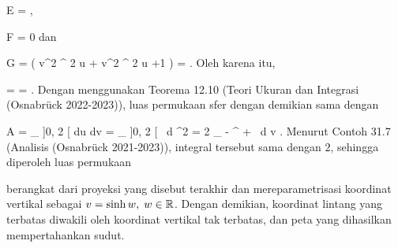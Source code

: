 {\mavergleichskettedisp
{\vergleichskette
{E
}
{ =} { {  }
}
{ } {
}
{ } {
}
{ } {
}
}
{}{}{,}

\mavergleichskettedisp
{\vergleichskette
{F
}
{ =} { 0
}
{ } {
}
{ } {
}
{ } {
}
}
{}{}{}
dan

\mavergleichskettedisp
{\vergleichskette
{G
}
{ =} { {  } \left(  v^2 \cos^{ 2  }  u + v^2 \sin^{ 2  }  u +1  \right)
}
{ =} { {  }
}
{ } {
}
{ } {
}
}
{}{}{.}
Oleh karena itu,

\mavergleichskettedisp
{\vergleichskette
{ 
}
{ =} { 
}
{ =} { {  }
}
{ } {
}
{ } {
}
}
{}{}{.}
Dengan menggunakan
Teorema 12.10 (Teori Ukuran dan Integrasi (Osnabrück 2022-2023)),
luas permukaan sfer dengan demikian sama dengan

\mavergleichskettealign
{\vergleichskettealign
{A
}
{ =} {
\int_{  ]0, 2 \pi[ \times \R   }   {  }  du \wedge dv
}
{ =} { \int_{ ]0, 2 \pi[ \times  \R   }   {  }    \,  d  \lambda^2
}
{ =} { 2 \pi \int_{  - \infty }^{ + \infty } {  } \, d  v
}
{ } {
}
}
{}
{}{.}
Menurut
Contoh 31.7 (Analisis (Osnabrück 2021-2023)),
integral tersebut sama dengan $2$, sehingga diperoleh luas permukaan

}
 {} berangkat dari proyeksi yang disebut terakhir dan mereparametrisasi koordinat vertikal sebagai $v=\sinh w,\;w\in{\mathbb R}$. Dengan demikian, koordinat lintang yang terbatas diwakili oleh koordinat vertikal tak terbatas, dan peta yang dihasilkan mempertahankan sudut.

